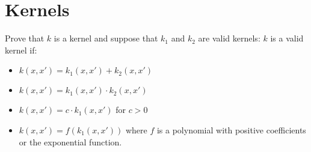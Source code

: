 \section{Kernels}

Prove that $k$ is a kernel and suppose that $k_1$ and $k_2$ are valid kernels: $k$ is a valid kernel if:

\begin{itemize}
	\item $k(x, x') = k_1(x, x') + k_2(x, x')$
	\item $k(x, x') = k_1(x, x') \cdot k_2(x, x')$
	\item $k(x, x') = c\cdot k_1(x, x')$ for $c > 0$
	\item $k(x, x') = f(k_1(x, x'))$ where $f$ is a polynomial with positive coefficients or the exponential function.
\end{itemize}